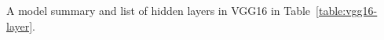 %
%
%
%
%




\makeappendices
{}
\label{chap:appendix}


\label{sec:vgg16-layers}

A model summary and list of hidden layers in VGG16 in Table~\ref{table:vgg16-layer}.

